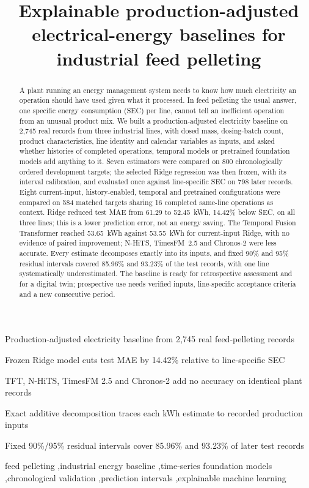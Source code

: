 \documentclass[preprint,12pt]{elsarticle}
\begin{document}
\ifdefined\withlinenumbers\linenumbers\fi
\begin{frontmatter}
\title{Explainable production-adjusted electrical-energy baselines for industrial feed pelleting}



\begin{abstract}
A plant running an energy management system needs to know how much electricity an operation should have used given what it processed. In feed pelleting the usual answer, one specific energy consumption (SEC) per line, cannot tell an inefficient operation from an unusual product mix. We built a production-adjusted electricity baseline on 2,745 real records from three industrial lines, with dosed mass, dosing-batch count, product characteristics, line identity and calendar variables as inputs, and asked whether histories of completed operations, temporal models or pretrained foundation models add anything to it. Seven estimators were compared on 800 chronologically ordered development targets; the selected Ridge regression was then frozen, with its interval calibration, and evaluated once against line-specific SEC on 798 later records. Eight current-input, history-enabled, temporal and pretrained configurations were compared on 584 matched targets sharing 16 completed same-line operations as context. Ridge reduced test MAE from 61.29 to 52.45~kWh, 14.42\% below SEC, on all three lines; this is a lower prediction error, not an energy saving. The Temporal Fusion Transformer reached 53.65~kWh against 53.55~kWh for current-input Ridge, with no evidence of paired improvement; N-HiTS, TimesFM~2.5 and Chronos-2 were less accurate. Every estimate decomposes exactly into its inputs, and fixed 90\% and 95\% residual intervals covered 85.96\% and 93.23\% of the test records, with one line systematically underestimated. The baseline is ready for retrospective assessment and for a digital twin; prospective use needs verified inputs, line-specific acceptance criteria and a new consecutive period.
\end{abstract}

\begin{highlights}
\item Production-adjusted electricity baseline from 2,745 real feed-pelleting records
\item Frozen Ridge model cuts test MAE by 14.42\% relative to line-specific SEC
\item TFT, N-HiTS, TimesFM 2.5 and Chronos-2 add no accuracy on identical plant records
\item Exact additive decomposition traces each kWh estimate to recorded production inputs
\item Fixed 90\%/95\% residual intervals cover 85.96\% and 93.23\% of later test records
\end{highlights}

\begin{keyword}
feed pelleting \sep industrial energy baseline \sep time-series foundation models \sep chronological validation \sep prediction intervals \sep explainable machine learning
\end{keyword}
\end{frontmatter}
\end{document}
